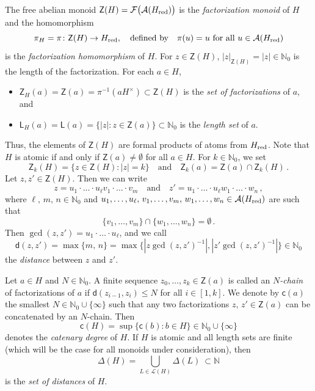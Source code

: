\documentclass[a4paper, 10pt]{amsart}
\theoremstyle{plain}
\theoremstyle{definition}
\theoremstyle{definition}
\newcommand{\N}{\mathbb N}
\newcommand{\red}{{\text{\rm red}}}
\numberwithin{equation}{section}
\begin{document}
The free abelian monoid $\mathsf Z (H) = \mathcal F \big(\mathcal A (H_{\red}) \big)$ is the {\it factorization monoid} of $H$ and the homomorphism
\begin{equation} \label{factorization-hom}
\pi_H = \pi \colon \mathsf Z (H) \to H_{\red}, \quad \text{defined by} \quad \pi (u) = u \ \text{for all $u \in \mathcal A (H_{\red})$}
\end{equation}
is the {\it factorization homomorphism} of $H$. For $z \in \mathsf Z (H)$, $|z|_{\mathsf Z (H)} = |z| \in \N_0$ is the length of the factorization. For each $a \in H$,
\begin{itemize}
\item $\mathsf Z_H (a) = \mathsf Z (a) = \pi^{-1} (aH^{\times}) \subset \mathsf Z (H)$ is the {\it set of factorizations} of $a$, and
    

\item $\mathsf L_H (a) = \mathsf L (a) = \{|z| \colon z \in \mathsf Z (a) \} \subset \N_0$ is the {\it length set} of $a$.
\end{itemize}
Thus, the elements of $\mathsf Z (H)$ are formal products of atoms from $H_{\red}$.   Note that $H$ is atomic if and only if $\mathsf Z (a) \ne \emptyset$ for all $a \in H$. For $k \in \N_0$, we set
\[
\mathsf Z_k (H) = \{ z \in \mathsf Z (H) \colon |z|=k\} \quad \text{and} \quad \mathsf Z_k (a) = \mathsf Z (a) \cap \mathsf Z_k (H) \,.
\]
Let $z, z' \in \mathsf Z (H)$. Then we can write
\[
z = u_1\cdot\ldots\cdot u_{\ell} v_1\cdot\ldots\cdot v_m\quad
\text{and}\quad z' = u_1\cdot\ldots\cdot u_{\ell} w_1\cdot\ldots
\cdot w_n\,,
\]
where $\ell,\,m,\,n\in\N_0$ and $u_1,\ldots,u_\ell,\,v_1,
\ldots,v_m,\,w_1,\ldots,w_n\in\mathcal A(H_\red)$ are such that
\[
\{v_1,\ldots,v_m\}\cap\{w_1,\ldots,w_n\} =\emptyset\,.
\]
Then $\gcd(z,z')=u_1\cdot\ldots\cdot u_{\ell}$, and we call
\[
\mathsf d (z,z') =\max\{m,\,n\} =\max\{ |z\gcd (z,z')^{-1}|,
|z'\gcd (z,z')^{-1}|\}\in\N_0
\]
the {\it distance} between $z$ and $z'$.

Let $a\in H$ and $N\in\N_0$. A finite sequence $z_0,\ldots,
z_k\in\mathsf Z (a)$ is called an {\it $N$-chain} of factorizations of $a$ if
$\mathsf d (z_{i-1},z_i)\le N$ for all $i\in [1,k]$. We denote by
$\mathsf c (a)$ the smallest $N\in\N _0\cup\{\infty\}$ such
that any two factorizations $z,\,z'\in\mathsf Z (a)$ can be
concatenated by an $N$-chain. Then
\[
\mathsf c(H) =\sup\{\mathsf c(b)\colon b\in H\}\in\N_0\cup
\{\infty\}
\]
denotes the {\it catenary degree} of $H$. If $H$ is atomic and all length sets are finite (which will be the case for all monoids under consideration), then 
\[
\Delta (H) = \bigcup_{L \in \mathcal L (H)} \Delta (L) \ \subset \N
\]
is the {\it set of distances} of $H$.
\end{document}

